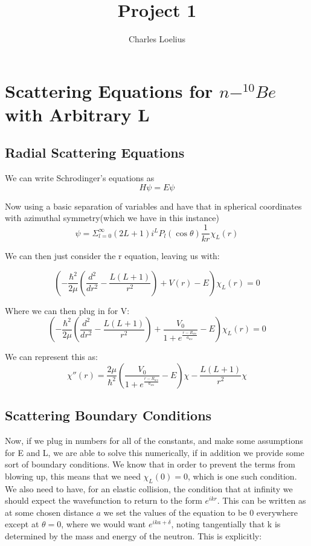 \documentclass[11pt]{article} %
\title{Project 1}
\author{Charles Loelius}
\begin{document}
\maketitle

\section{Scattering Equations for  $n-^{10}Be $ with Arbitrary L}
\subsection{Radial Scattering Equations}
We can write Schrodinger's equations as 
\begin{equation}
H\psi=E\psi
\end{equation}

Now using a basic separation of variables and have that in spherical coordinates with azimuthal symmetry(which we have in this instance)\\

\begin{equation}
\psi=\Sigma_{l=0}^\infty (2L+1)i^LP_l(\cos\theta)\frac{1}{kr}\chi_L(r)
\end{equation}

We can then just consider the r equation, leaving us with:

\begin{equation}
(-\frac{\hbar^2}{2\mu}(\frac{d^2}{dr^2}-\frac{L(L+1)}{r^2})+V(r)-E)\chi_L(r)=0
\end{equation}

Where we can then plug in for V:\\
\begin{equation}
(-\frac{\hbar^2}{2\mu}(\frac{d^2}{dr^2}-\frac{L(L+1)}{r^2})+\frac{V_0}{1+e^{\frac{r-R_{ws}}{a_{ws}}}}-E)\chi_L(r)=0
\end{equation}

We can represent this as:\\

\begin{equation}
\boxed{\chi''(r)=\frac{2\mu}{\hbar^2}(\frac{V_0}{1+e^{\frac{r-R_{ws}}{a_{ws}}}}-E)\chi-\frac{L(L+1)}{r^2}\chi}
\end{equation}
\subsection{Scattering Boundary Conditions}
Now, if we plug in numbers for all of the constants, and make some assumptions for E and L, we are able to solve this numerically, if in addition we provide some sort of boundary conditions. We know that in order to prevent the terms from blowing up, this means that we need $\chi_L(0)=0$, which is one such condition. We also need to have, for an elastic collision, the condition that at infinity we should expect the wavefunction to return to the form $e^{ikr}$. This can be written as at some chosen distance $a$ we set the values of the equation to be 0 everywhere except at $\theta=0$, where we would want $e^{ika+\delta}$, noting tangentially that k is determined by the mass and energy of the neutron. This is explicitly:\\
\end{document}
